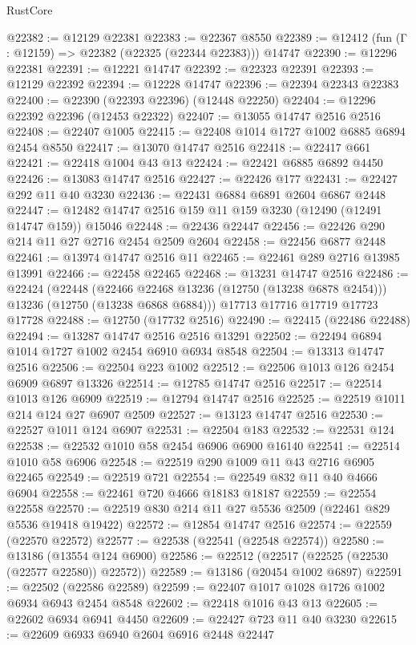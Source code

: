 \begin{lexlean}{RustCore}
\begin{coremodule}
@22382 := @12129 @22381
@22383 := @22367 @8550
@22389 := @12412 (fun (Γ : @12159) => @22382 (@22325 (@22344 @22383))) @14747
@22390 := @12296 @22381
@22391 := @12221 @14747
@22392 := @22323 @22391
@22393 := @12129 @22392
@22394 := @12228 @14747
@22396 := @22394 @22343 @22383
@22400 := @22390 (@22393 @22396) (@12448 @22250)
@22404 := @12296 @22392 @22396 (@12453 @22322)
@22407 := @13055 @14747 @2516 @2516
@22408 := @22407 @1005
@22415 := @22408 @1014 @1727 @1002 @6885 @6894 @2454 @8550
@22417 := @13070 @14747 @2516
@22418 := @22417 @661
@22421 := @22418 @1004 @43 @13
@22424 := @22421 @6885 @6892 @4450
@22426 := @13083 @14747 @2516
@22427 := @22426 @177
@22431 := @22427 @292 @11 @40 @3230
@22436 := @22431 @6884 @6891 @2604 @6867 @2448
@22447 := @12482 @14747 @2516 @159 @11 @159 @3230 (@12490 (@12491 @14747 @159)) @15046
@22448 := @22436 @22447
@22456 := @22426 @290 @214 @11 @27 @2716 @2454 @2509 @2604
@22458 := @22456 @6877 @2448
@22461 := @13974 @14747 @2516 @11
@22465 := @22461 @289 @2716 @13985 @13991
@22466 := @22458 @22465
@22468 := @13231 @14747 @2516
@22486 := @22424
    (@22448
      (@22466 @22468 @13236 (@12750 (@13238 @6878 @2454)))
      @13236
      (@12750 (@13238 @6868 @6884)))
    @17713
    @17716
    @17719
    @17723
    @17728
@22488 := @12750 (@17732 @2516)
@22490 := @22415 (@22486 @22488)
@22494 := @13287 @14747 @2516 @2516 @13291
@22502 := @22494 @6894 @1014 @1727 @1002 @2454 @6910 @6934 @8548
@22504 := @13313 @14747 @2516
@22506 := @22504 @223 @1002
@22512 := @22506 @1013 @126 @2454 @6909 @6897 @13326
@22514 := @12785 @14747 @2516
@22517 := @22514 @1013 @126 @6909
@22519 := @12794 @14747 @2516
@22525 := @22519 @1011 @214 @124 @27 @6907 @2509
@22527 := @13123 @14747 @2516
@22530 := @22527 @1011 @124 @6907
@22531 := @22504 @183
@22532 := @22531 @124
@22538 := @22532 @1010 @58 @2454 @6906 @6900 @16140
@22541 := @22514 @1010 @58 @6906
@22548 := @22519 @290 @1009 @11 @43 @2716 @6905 @22465
@22549 := @22519 @721
@22554 := @22549 @832 @11 @40 @4666 @6904
@22558 := @22461 @720 @4666 @18183 @18187
@22559 := @22554 @22558
@22570 := @22519 @830 @214 @11 @27 @5536 @2509 (@22461 @829 @5536 @19418 @19422)
@22572 := @12854 @14747 @2516
@22574 := @22559 (@22570 @22572)
@22577 := @22538 (@22541 (@22548 @22574))
@22580 := @13186 (@13554 @124 @6900)
@22586 := @22512 (@22517 (@22525 (@22530 (@22577 @22580)) @22572))
@22589 := @13186 (@20454 @1002 @6897)
@22591 := @22502 (@22586 @22589)
@22599 := @22407 @1017 @1028 @1726 @1002 @6934 @6943 @2454 @8548
@22602 := @22418 @1016 @43 @13
@22605 := @22602 @6934 @6941 @4450
@22609 := @22427 @723 @11 @40 @3230
@22615 := @22609 @6933 @6940 @2604 @6916 @2448 @22447

\end{coremodule}
\end{lexlean}
